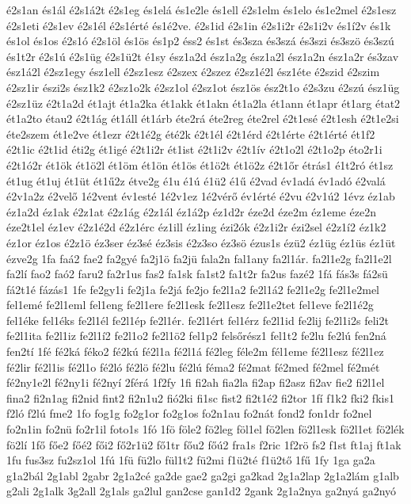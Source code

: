 {é2s1an
és1ál
é2s1á2t
é2s1eg
és1elá
és1e2le
és1ell
é2s1elm
és1elo
és1e2mel
é2s1esz
é2s1eti
é2s1ev
é2s1él
é2s1érté
és1é2ve.
é2s1id
é2s1in
é2s1i2r
é2s1i2v
és1í2v
és1k
és1ol
és1os
é2s1ó
é2s1öl
és1ös
és1p2
éss2
és1st
és3sza
és3szá
és3szi
és3szö
és3szú
és1t2r
é2s1ú
é2s1üg
é2s1ü2t
é1sy
ész1a2d
ész1a2g
ész1a2l
ész1a2n
ész1a2r
és3zav
ész1á2l
é2sz1egy
ész1ell
é2sz1esz
é2szex
é2szez
é2sz1é2l
ész1éte
é2szid
é2szim
é2sz1ir
észi2s
ész1k2
é2sz1o2k
é2sz1ol
é2sz1ot
ész1ös
ész2t1o
é2s3zu
é2szú
ész1üg
é2sz1üz
é2t1a2d
ét1ajt
ét1a2ka
ét1akk
ét1akn
ét1a2la
ét1ann
ét1apr
ét1arg
état2
ét1a2to
étau2
é2t1ág
ét1áll
ét1árb
éte2rá
éte2reg
éte2rel
é2t1esé
é2t1esh
é2t1e2si
éte2szem
ét1e2ve
ét1ezr
é2t1é2g
été2k
é2t1él
é2t1érd
é2t1érte
é2t1érté
ét1f2
é2t1ic
é2t1id
éti2g
ét1igé
é2t1i2r
ét1ist
é2t1i2v
é2t1ív
é2t1o2l
é2t1o2p
éto2r1i
é2t1ó2r
ét1ök
ét1ö2l
ét1öm
ét1ön
ét1ös
ét1ö2t
ét1ö2z
é2t1őr
étrás1
é1t2ró
ét1sz
ét1ug
ét1uj
ét1üt
ét1ű2z
étve2g
é1u
é1ú
é1ü2
é1ű
é2vad
év1adá
év1adó
é2valá
é2v1a2z
é2velő
1é2vent
év1esté
1é2v1ez
1é2vérő
év1érté
é2vu
é2v1ú2
1évz
éz1ab
éz1a2d
éz1ak
é2z1at
é2z1ág
é2z1ál
éz1á2p
éz1d2r
éze2d
éze2m
éz1eme
éze2n
éze2t1el
éz1ev
é2z1é2d
é2z1érc
éz1ill
éz1ing
ézi2ók
é2z1i2r
ézi2sel
é2z1í2
éz1k2
éz1or
éz1os
é2z1ö
éz3ser
éz3sé
éz3sis
é2z3so
éz3sö
ézus1s
ézü2
éz1üg
éz1üs
éz1üt
ézve2g
1fa
faá2
fae2
fa2gyé
fa2j1ö
fa2jü
fala2n
fal1any
fa2l1ár.
fa2l1e2g
fa2l1e2l
fa2lí
fao2
faó2
faru2
fa2r1us
fas2
fa1sk
fa1st2
fa1t2r
fa2us
fazé2
1fá
fás3s
fá2sü
fá2t1é
fázás1
1fe
fe2gy1i
fe2j1a
fe2já
fe2jo
fe2l1a2
fe2l1á2
fe2l1e2g
fe2l1e2mel
fel1emé
fe2l1eml
fel1eng
fe2l1ere
fe2l1esk
fe2l1esz
fe2l1e2tet
fel1eve
fe2l1é2g
fel1éke
fel1éks
fe2l1él
fe2l1ép
fe2l1ér.
fe2l1ért
fel1érz
fe2l1id
fe2lij
fe2l1i2s
feli2t
fe2l1ita
fe2l1iz
fe2l1í2
fe2l1o2
fe2l1ö2
fel1p2
felsőrész1
fel1t2
fe2lu
fe2lú
fen2ná
fen2tí
1fé
fé2ká
féko2
fé2kú
fé2l1a
fé2l1á
fé2leg
féle2m
fél1eme
fé2l1esz
fé2l1ez
fé2lir
fé2l1is
fé2l1o
fé2ló
fé2lö
fé2lu
fé2lú
féma2
fé2mat
fé2med
fé2mel
fé2mét
fé2ny1e2l
fé2ny1i
fé2nyí
2férá
1f2fy
1fi
fi2ah
fia2la
fi2ap
fi2asz
fi2av
fie2
fi2l1el
fina2
fi2n1ag
fi2nid
fint2
fi2n1u2
fió2ki
fi1sc
fist2
fi2t1é2
fi2tor
1fí
f1k2
fki2
fkis1
f2ló
f2lú
fme2
1fo
fog1g
fo2g1or
fo2g1os
fo2n1au
fo2nát
fond2
fon1dr
fo2nel
fo2n1in
fo2nü
fo2r1il
foto1s
1fó
1fö
föle2
fö2leg
föl1el
fö2len
fö2l1esk
fö2l1et
fö2lék
fö2lí
1fő
főe2
főé2
fői2
fő2r1ü2
fő1tr
főu2
főú2
fra1s
f2ric
1f2rö
fs2
f1st
ft1aj
ft1ak
1fu
fus3sz
fu2sz1ol
1fú
1fü
fü2lo
fül1t2
fü2mi
f1ü2té
f1ü2tő
1fű
1fy
1ga
ga2a
g1a2bál
2g1abl
2gabr
2g1a2cé
ga2de
gae2
ga2gi
ga2kad
2g1a2lap
2g1a2lám
g1alb
g2ali
2g1alk
3g2all
2g1als
ga2lul
gan2cse
gan1d2
2gank
2g1a2nya
ga2nyá
ga2nyó
}
